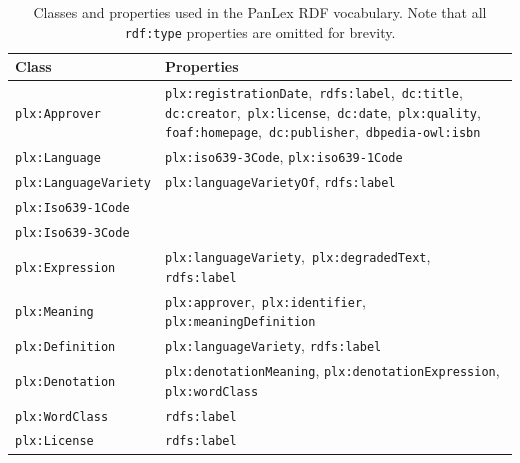 \documentclass[sw]{iosart2c}
\begin{document}
\begin{table}
  \begin{tiny}
  \begin{tabular}{p{52px}p{140px}}
    Class                 & Properties \\
    \toprule
    \texttt{plx:Approver} & \mbox{\texttt{plx:registrationDate}, \texttt{rdfs:label}, \texttt{dc:title},}
                            \mbox{\texttt{dc:creator}, \texttt{plx:license}, \texttt{dc:date}, \texttt{plx:quality},}
                            \mbox{\texttt{foaf:homepage}, \texttt{dc:publisher}, \texttt{dbpedia-owl:isbn}} \\
    \midrule
    \texttt{plx:Language} & \texttt{plx:iso639-3Code}, \texttt{plx:iso639-1Code} \\
    \midrule
    \texttt{plx:LanguageVariety}
                          & \texttt{plx:languageVarietyOf}, \texttt{rdfs:label} \\
    \midrule
    \texttt{plx:Iso639-1Code} & \\
    \midrule
    \texttt{plx:Iso639-3Code} & \\
    \midrule
    \texttt{plx:Expression}
                          & \mbox{\texttt{plx:languageVariety}, \texttt{plx:degradedText},} \texttt{rdfs:label} \\
    \midrule
    \texttt{plx:Meaning}
                          & \mbox{\texttt{plx:approver}, \texttt{plx:identifier},} \texttt{plx:meaningDefinition} \\
    \midrule
    \texttt{plx:Definition}
                          & \texttt{plx:languageVariety}, \texttt{rdfs:label} \\
    \midrule
    \texttt{plx:Denotation}
                          & \texttt{plx:denotationMeaning}, \texttt{plx:denotationExpression}, \texttt{plx:wordClass} \\
    \midrule
    \texttt{plx:WordClass}  
                          & \texttt{rdfs:label} \\
    \midrule
    \texttt{plx:License}  & \texttt{rdfs:label} \\
    \bottomrule
  \end{tabular}
  \end{tiny}
  \caption{Classes and properties used in the PanLex RDF vocabulary. Note that all \texttt{rdf:type} properties are omitted for brevity.}
  \label{tbl:vocabulary}
\end{table}
\end{document}
